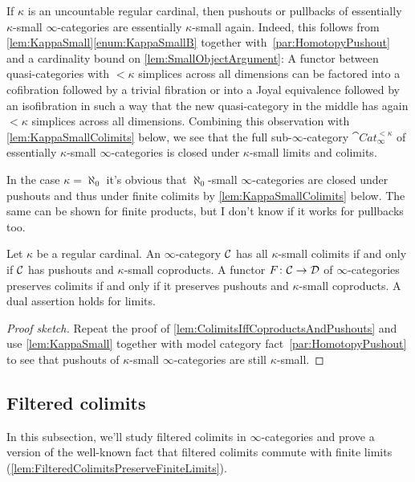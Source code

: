 \begin{rem}\label{rem:KappaSmallClosedUnderPushouts}
	If $\kappa$ is an uncountable regular cardinal, then pushouts or pullbacks of essentially $\kappa$-small $\infty$-categories are essentially $\kappa$-small again. Indeed, this follows from \cref{lem:KappaSmall}\cref{enum:KappaSmallB} together with~\cref{par:HomotopyPushout} and a cardinality bound on \cref{lem:SmallObjectArgument}: A functor between quasi-categories with $<\kappa$ simplices across all dimensions can be factored into a cofibration followed by a trivial fibration or into a Joyal equivalence followed by an isofibration in such a way that the new quasi-category in the middle has again $<\kappa$ simplices across all dimensions. Combining this observation with \cref{lem:KappaSmallColimits} below, we see that the full sub-$\infty$-category $\cat{Cat}_\infty^{<\kappa}$ of essentially $\kappa$-small $\infty$-categories is closed under $\kappa$-small limits and colimits.
	
	In the case $\kappa=\aleph_0$ it's obvious that $\aleph_0$-small $\infty$-categories are closed under pushouts and thus under finite colimits by \cref{lem:KappaSmallColimits} below. The same can be shown for finite products, but I don't know if it works for pullbacks too.
\end{rem}
\begin{lem}\label{lem:KappaSmallColimits}
	Let $\kappa$ be a regular cardinal. An $\infty$-category $\mathcal{C}$ has all $\kappa$-small colimits if and only if $\mathcal{C}$ has pushouts and $\kappa$-small coproducts. A functor $F\colon \mathcal{C}\rightarrow\mathcal{D}$ of $\infty$-categories preserves colimits if and only if it preserves pushouts and $\kappa$-small coproducts. A dual assertion holds for limits.
\end{lem}
\begin{proof}[Proof sketch]
	Repeat the proof of \cref{lem:ColimitsIffCoproductsAndPushouts} and use \cref{lem:KappaSmall} together with model category fact~\cref{par:HomotopyPushout} to see that pushouts of $\kappa$-small $\infty$-categories are still $\kappa$-small.
\end{proof}
\subsection{Filtered colimits}

In this subsection, we'll study filtered colimits in $\infty$-categories and prove a version of the well-known fact that filtered colimits commute with finite limits (\cref{lem:FilteredColimitsPreserveFiniteLimits}).

